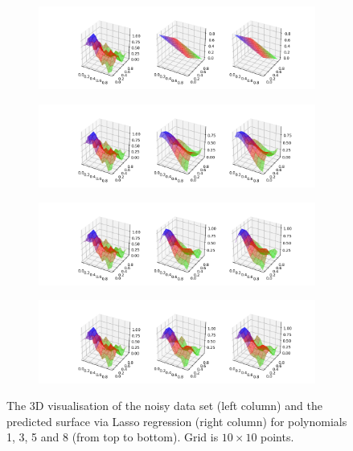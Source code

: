 \begin{figure}[!ht]
\begin{subfigure}{\textwidth}
  \centering
  \includegraphics[width=1\linewidth]{images/surf/fake_linear_p01_n10.png}
\end{subfigure}
\begin{subfigure}{\textwidth}
  \centering
  \includegraphics[width=1\linewidth]{images/surf/fake_linear_p03_n10.png}
\end{subfigure}
\begin{subfigure}{\textwidth}
  \centering
  \includegraphics[width=1\linewidth]{images/surf/fake_linear_p05_n10.png}
\end{subfigure}
\begin{subfigure}{\textwidth}
  \centering
  \includegraphics[width=1\linewidth]{images/surf/fake_linear_p08_n10.png}
\end{subfigure}
\caption{The 3D visualisation of the noisy data set (left column) and the predicted surface via Lasso regression (right column) for polynomials 1, 3, 5 and 8 (from top to bottom). Grid is $10\times10$ points.}
\label{fig:linear-surf1}
\end{figure}

